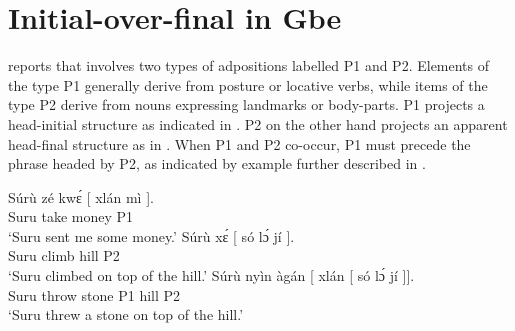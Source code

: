 \documentclass[output=paper]{langsci/langscibook}
\begin{document}
\section{Initial-over-final in Gbe}

\citet{Aboh2010c} reports that  involves two types of adpositions
labelled P1 and P2. Elements of the type P1 generally derive from posture or
locative verbs, while items of the type P2 derive from nouns expressing
landmarks or body-parts. P1 projects a head-initial structure as indicated in
. P2 on the other hand projects an apparent head-final
structure as in . When P1 and P2 co-occur, P1 must precede
the phrase headed by P2, as indicated by example  further
described in .

\ea\label{ex:aboh:14.6} 
    \ea\label{ex:aboh:14.6a}
        \gll    Súrù zé kw\'ɛ [ xlán mì ]. \\
                Suru take money {} P1 \Fsg{} {} \\
        \glt    \enquote*{Suru sent me some money.}
    \ex\label{ex:aboh:14.6b}
        \gll    Súrù x\'ɛ [ só l\'ɔ jí ]. \\
                Suru climb {} hill \Det{} P2 {} \\
        \glt    \enquote*{Suru climbed on top of the hill.}
    \ex\label{ex:aboh:14.6c}
        \gll    Súrù nyìn àgán [ xlán [ só l\'ɔ jí ]]. \\
                Suru throw stone {} P1 {} hill \Det{} P2 {} \\
        \glt    \enquote*{Suru threw a stone on top of the hill.}
    \ex\label{ex:aboh:14.6d}
    \z
\z
\end{document}
